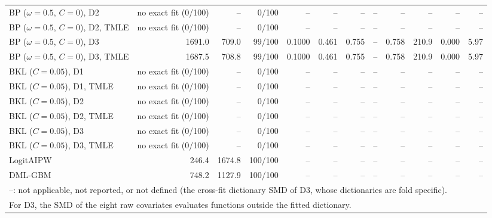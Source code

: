 \begin{tabular}{lrrrrrrrrrrr}
BP ($\omega=0.5$, $C=0$), D2 & no exact fit (0/100) & -- & 0/100 & -- & -- & -- & -- & -- & -- & -- & -- \\
BP ($\omega=0.5$, $C=0$), D2, TMLE & no exact fit (0/100) & -- & 0/100 & -- & -- & -- & -- & -- & -- & -- & -- \\
BP ($\omega=0.5$, $C=0$), D3 & 1691.0 & 709.0 & 99/100 & 0.1000 & 0.461 & 0.755 & -- & 0.758 & 210.9 & 0.000 & 5.97 \\
BP ($\omega=0.5$, $C=0$), D3, TMLE & 1687.5 & 708.8 & 99/100 & 0.1000 & 0.461 & 0.755 & -- & 0.758 & 210.9 & 0.000 & 5.97 \\
BKL ($C=0.05$), D1 & no exact fit (0/100) & -- & 0/100 & -- & -- & -- & -- & -- & -- & -- & -- \\
BKL ($C=0.05$), D1, TMLE & no exact fit (0/100) & -- & 0/100 & -- & -- & -- & -- & -- & -- & -- & -- \\
BKL ($C=0.05$), D2 & no exact fit (0/100) & -- & 0/100 & -- & -- & -- & -- & -- & -- & -- & -- \\
BKL ($C=0.05$), D2, TMLE & no exact fit (0/100) & -- & 0/100 & -- & -- & -- & -- & -- & -- & -- & -- \\
BKL ($C=0.05$), D3 & no exact fit (0/100) & -- & 0/100 & -- & -- & -- & -- & -- & -- & -- & -- \\
BKL ($C=0.05$), D3, TMLE & no exact fit (0/100) & -- & 0/100 & -- & -- & -- & -- & -- & -- & -- & -- \\
LogitAIPW & 246.4 & 1674.8 & 100/100 & -- & -- & -- & -- & -- & -- & -- & -- \\
DML-GBM & 748.2 & 1127.9 & 100/100 & -- & -- & -- & -- & -- & -- & -- & -- \\
\hline
\multicolumn{12}{l}{--: not applicable, not reported, or not defined (the cross-fit dictionary SMD of D3, whose dictionaries are fold specific).} \\
\multicolumn{12}{l}{For D3, the SMD of the eight raw covariates evaluates functions outside the fitted dictionary.} \\
\hline
\end{tabular}
